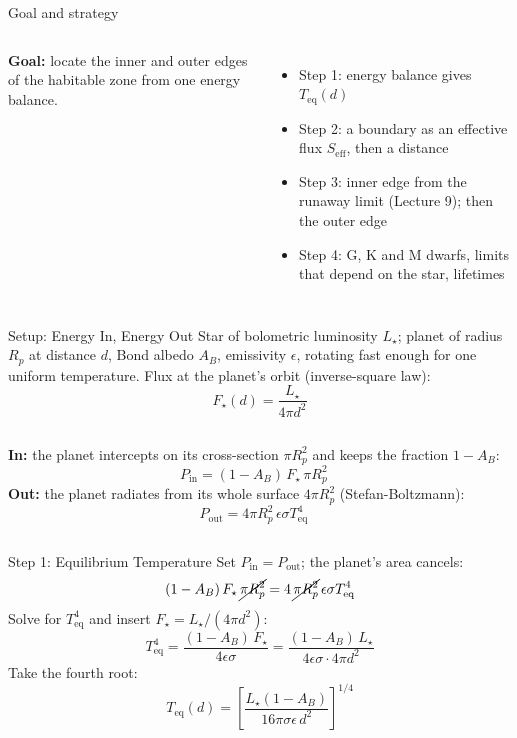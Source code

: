 \documentclass[aspectratio=169, 11pt]{beamer}
\begin{document}
\begin{frame}{Goal and strategy}
  \begin{columns}[c]
    \column{\recapfigcolnarrow}
    \column{\recaptextcolwide}
    \small
    \textbf{Goal:} locate the inner and outer edges of the habitable zone from one energy balance.
    \vskip4pt
    \begin{itemize}\setlength\itemsep{2pt}
      \item Step 1: energy balance gives $T_\mathrm{eq}(d)$
      \item Step 2: a boundary as an effective flux $S_{\mathrm{eff}}$, then a distance
      \item Step 3: inner edge from the runaway limit (Lecture 9); then the outer edge
      \item Step 4: G, K and M dwarfs, limits that depend on the star, lifetimes
    \end{itemize}
    \vskip4pt
  \end{columns}
\end{frame}

\begin{frame}{Setup: Energy In, Energy Out}
  Star of bolometric luminosity $L_\star$; planet of radius $R_p$ at distance $d$, Bond albedo $A_B$, emissivity $\epsilon$, rotating fast enough for one uniform temperature.
  \vskip4pt
  Flux at the planet's orbit (inverse-square law):
  \[
    F_\star(d) = \frac{L_\star}{4\pi d^2}
  \]
  \begin{columns}[T]
    \textbf{In:} the planet intercepts on its cross-section $\pi R_p^2$ and keeps the fraction $1 - A_B$:
    \[
      P_{\mathrm{in}} = (1 - A_B)\,F_\star\,\pi R_p^2
    \]
    \textbf{Out:} the planet radiates from its whole surface $4\pi R_p^2$ (Stefan-Boltzmann):
    \[
      P_{\mathrm{out}} = 4\pi R_p^2\,\epsilon\sigma T_{\mathrm{eq}}^4
    \]
  \end{columns}
  \vskip4pt
\end{frame}

\begin{frame}{Step 1: Equilibrium Temperature}
  Set $P_{\mathrm{in}} = P_{\mathrm{out}}$; the planet's area cancels:
  \[
    (1 - A_B)\,F_\star\,\cancel{\pi R_p^2} = 4\,\cancel{\pi R_p^2}\,\epsilon\sigma T_{\mathrm{eq}}^4
  \]
  Solve for $T_{\mathrm{eq}}^4$ and insert $F_\star = L_\star/(4\pi d^2)$:
  \[
    T_{\mathrm{eq}}^4 = \frac{(1 - A_B)\,F_\star}{4\epsilon\sigma} = \frac{(1 - A_B)\,L_\star}{4\epsilon\sigma \cdot 4\pi d^2}
  \]
  Take the fourth root:
  \[
    \boxed{\;T_{\mathrm{eq}}(d) = \left[\frac{L_\star (1 - A_B)}{16\pi\sigma\epsilon\,d^2}\right]^{1/4}\;}
  \]
\end{frame}
\end{document}
